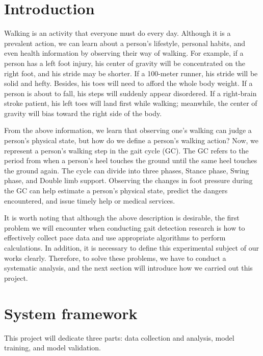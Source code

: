 \documentclass[10pt,twocolumn,letterpaper]{article}
\begin{document}
\section{Introduction}
\label{sec:intro}

Walking is an activity that everyone must do every day. Although it is a prevalent action, we can learn about a person's lifestyle, personal habits, and even health information by observing their way of walking. For example, if a person has a left foot injury, his center of gravity will be concentrated on the right foot, and his stride may be shorter. If a 100-meter runner, his stride will be solid and hefty. Besides, his toes will need to afford the whole body weight. If a person is about to fall, his steps will suddenly appear disordered. If a right-brain stroke patient, his left toes will land first while walking; meanwhile, the center of gravity will bias toward the right side of the body.~\cite{10.1007/978-3-319-59147-6_30}

From the above information, we learn that observing one's walking can judge a person's physical state, but how do we define a person's walking action? Now, we represent a person's walking step in the gait cycle (GC). The GC refers to the period from when a person's heel touches the ground until the same heel touches the ground again. The cycle can divide into three phases, Stance phase, Swing phase, and Double limb support. Observing the changes in foot pressure during the GC can help estimate a person's physical state, predict the dangers encountered, and issue timely help or medical services.~\cite{CAMPS2018119}

It is worth noting that although the above description is desirable, the first problem we will encounter when conducting gait detection research is how to effectively collect pace data and use appropriate algorithms to perform calculations. In addition, it is necessary to define this experimental subject of our works clearly. Therefore, to solve these problems, we have to conduct a systematic analysis, and the next section will introduce how we carried out this project.~\cite{NUTT2011734}

\section{System framework}
\label{sec:framework}

This project will dedicate three parts: data collection and analysis, model training, and model validation.
\end{document}
